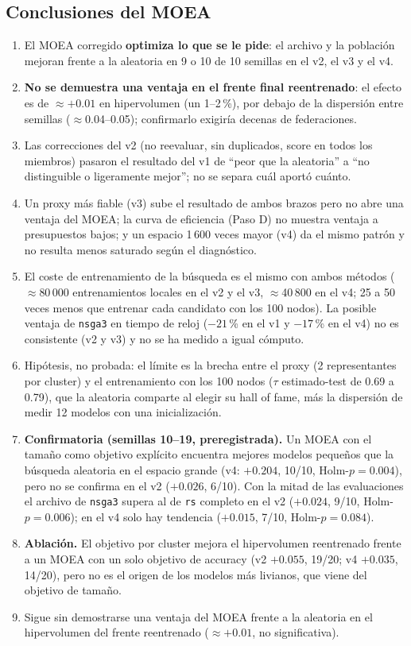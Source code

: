 \documentclass[11pt,a4paper]{article}
\begin{document}
\subsection*{Conclusiones del MOEA}
\begin{enumerate}[leftmargin=*,itemsep=2pt]
\item El MOEA corregido \textbf{optimiza lo que se le pide}: el archivo y la población mejoran frente a la aleatoria en 9 o 10 de 10 semillas en el v2, el v3 y el v4.
\item \textbf{No se demuestra una ventaja en el frente final reentrenado}: el efecto es de $\approx+0.01$ en hipervolumen (un 1--2\,\%), por debajo de la dispersión entre semillas ($\approx$0.04--0.05); confirmarlo exigiría decenas de federaciones.
\item Las correcciones del v2 (no reevaluar, sin duplicados, score en todos los miembros) pasaron el resultado del v1 de ``peor que la aleatoria'' a ``no distinguible o ligeramente mejor''; no se separa cuál aportó cuánto.
\item Un proxy más fiable (v3) sube el resultado de ambos brazos pero no abre una ventaja del MOEA; la curva de eficiencia (Paso D) no muestra ventaja a presupuestos bajos; y un espacio 1\,600 veces mayor (v4) da el mismo patrón y no resulta menos saturado según el diagnóstico.
\item El coste de entrenamiento de la búsqueda es el mismo con ambos métodos ($\approx$80\,000 entrenamientos locales en el v2 y el v3, $\approx$40\,800 en el v4; 25 a 50 veces menos que entrenar cada candidato con los 100 nodos). La posible ventaja de \texttt{nsga3} en tiempo de reloj ($-21$\,\% en el v1 y $-17$\,\% en el v4) no es consistente (v2 y v3) y no se ha medido a igual cómputo.
\item Hipótesis, no probada: el límite es la brecha entre el proxy (2 representantes por cluster) y el entrenamiento con los 100 nodos ($\tau$ estimado-test de 0.69 a 0.79), que la aleatoria comparte al elegir su hall of fame, más la dispersión de medir 12 modelos con una inicialización.
\item \textbf{Confirmatoria (semillas 10--19, preregistrada).} Un MOEA con el tamaño como objetivo explícito encuentra mejores modelos pequeños que la búsqueda aleatoria en el espacio grande (v4: $+0.204$, 10/10, Holm-$p=0.004$), pero no se confirma en el v2 ($+0.026$, 6/10). Con la mitad de las evaluaciones el archivo de \texttt{nsga3} supera al de \texttt{rs} completo en el v2 ($+0.024$, 9/10, Holm-$p=0.006$); en el v4 solo hay tendencia ($+0.015$, 7/10, Holm-$p=0.084$).
\item \textbf{Ablación.} El objetivo por cluster mejora el hipervolumen reentrenado frente a un MOEA con un solo objetivo de accuracy (v2 $+0.055$, 19/20; v4 $+0.035$, 14/20), pero no es el origen de los modelos más livianos, que viene del objetivo de tamaño.
\item Sigue sin demostrarse una ventaja del MOEA frente a la aleatoria en el hipervolumen del frente reentrenado ($\approx+0.01$, no significativa).
\end{enumerate}
\end{document}
